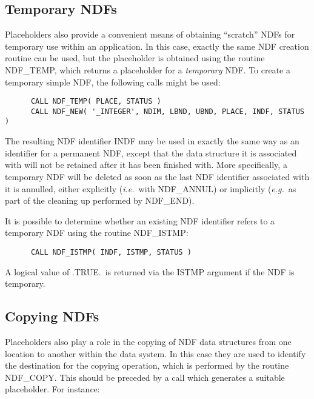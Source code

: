 \documentclass[twoside,11pt]{article}
\newcommand{\htmlref}[2]{#1}
\newcommand{\xlabel}[1]{}
\newcommand{\st}[1]{{\em{#1}}}
\begin{document}
\subsection{\xlabel{temporary_ndfs}Temporary NDFs}

Placeholders also provide a convenient means of obtaining ``scratch'' NDFs
for temporary use within an application.
In this case, exactly the same NDF creation routine can be used, but the
placeholder is obtained using the routine \htmlref{NDF\_TEMP}{NDF_TEMP}, which returns a
placeholder for a \st{temporary\/} NDF. 
To create a temporary simple NDF, the following calls might be used:

\small
\begin{verbatim}
      CALL NDF_TEMP( PLACE, STATUS )
      CALL NDF_NEW( '_INTEGER', NDIM, LBND, UBND, PLACE, INDF, STATUS )
\end{verbatim}
\normalsize

The resulting NDF identifier INDF may be used in exactly the same way as an
identifier for a permanent NDF, except that the data structure it is
associated with will not be retained after it has been finished with. 
More specifically, a temporary NDF will be deleted as soon as the last NDF
identifier associated with it is annulled, either explicitly (\st{i.e.}\ with
\htmlref{NDF\_ANNUL}{NDF_ANNUL}) or implicitly (\st{e.g.}\ as part of the cleaning up performed by
\htmlref{NDF\_END}{NDF_END}). 

It is possible to determine whether an existing NDF identifier refers to a 
temporary NDF using the routine \htmlref{NDF\_ISTMP}{NDF_ISTMP}:

\small
\begin{verbatim}
      CALL NDF_ISTMP( INDF, ISTMP, STATUS )
\end{verbatim}
\normalsize

A logical value of .TRUE.\ is returned via the ISTMP argument if the NDF is 
temporary.

\subsection{\xlabel{copying_ndfs}Copying NDFs}

Placeholders also play a role in the copying of NDF data structures from one 
location to another within the data system.
In this case they are used to identify the destination for the copying 
operation, which is performed by the routine \htmlref{NDF\_COPY}{NDF_COPY}.
This should be preceded by a call which generates a suitable placeholder. 
For instance:
\end{document}
